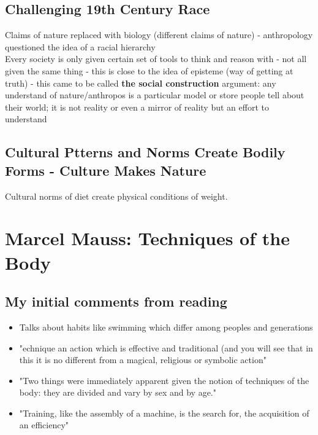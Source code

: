 \documentclass{article}
\begin{document}
\subsection{Challenging 19th Century Race}
Claims of nature replaced with biology (different claims of nature) - anthropology questioned the idea of a racial hierarchy \\ 
Every society is only given certain set of tools to think and reason with - not all given the same thing - this is close to the idea of episteme (way of getting at truth) - this came to be called \textbf{the social construction} argument: any understand of nature/anthropos is a particular model or store people tell about their world; it is not reality or even a mirror of reality but an effort to understand

\subsection{Cultural Ptterns and Norms Create Bodily Forms - Culture Makes Nature}
Cultural norms of diet create physical conditions of weight. 

\section{Marcel Mauss: Techniques of the Body}
\subsection{My initial comments from reading}
\begin{itemize}
\item Talks about habits like swimming which differ among peoples and generations
\item "echnique an action which is effective and traditional (and you will see that in this it is no different from a magical, religious or symbolic action"
\item "Two things were immediately apparent given the notion of techniques of the body: they are divided and vary by sex and by age."
\item "Training, like the assembly of a machine, is the search for, the acquisition of an efficiency"
\end{itemize}
\end{document}
